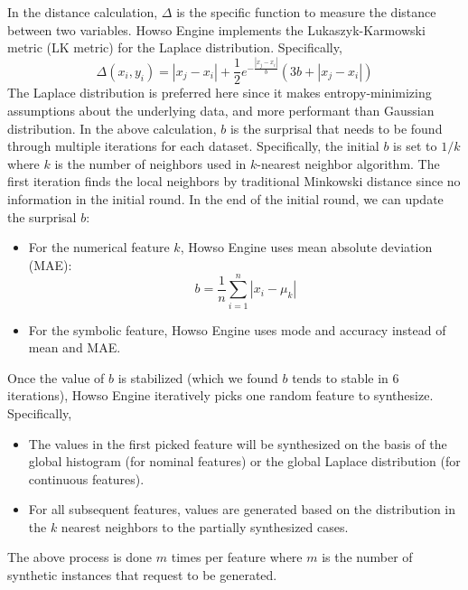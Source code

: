 \documentclass[sigconf,review,anonymous,nonacm=true]{acmart}
\begin{document}
In the distance calculation, $\Delta$ is the specific function to measure the distance between two variables. Howso Engine implements the Lukaszyk-Karmowski metric (LK metric) for the Laplace distribution. Specifically,
\begin{equation}
    \Delta(x_i,y_i) = |x_j - x_i| + \frac{1}{2} e^{-\frac{|x_j - x_i|}{b}} \left( 3b+|x_j - x_i| \right)
\end{equation}
The Laplace distribution is preferred here since it makes entropy-minimizing assumptions about the underlying data, and more performant than Gaussian distribution. In the above calculation, $b$ is the surprisal that needs to be found through multiple iterations for each dataset. Specifically, the initial $b$ is set to $1/k$ where $k$ is the number of neighbors used in $k$-nearest neighbor algorithm. The first iteration finds the local neighbors by traditional Minkowski distance since no information in the initial round. In the end of the initial round, we can update the surprisal $b$:
\begin{itemize}
    \item For the numerical feature $k$, Howso Engine uses mean absolute deviation (MAE):
    \begin{equation}
        b = \frac{1}{n} \sum_{i=1}^{n} |x_i - \mu_k|
    \end{equation}
    \item For the symbolic feature, Howso Engine uses mode and accuracy instead of mean and MAE.
\end{itemize}

Once the value of $b$ is stabilized (which we found $b$ tends to stable in 6 iterations), Howso Engine iteratively picks one random feature to synthesize. Specifically,
\begin{itemize}
    \item The values in the first picked feature will be synthesized on the basis of the global histogram (for nominal features) or the global Laplace distribution (for continuous features).
    \item For all subsequent features, values are generated based on the distribution in the $k$ nearest neighbors to the partially synthesized cases.
\end{itemize}
The above process is done $m$ times per feature where $m$ is the number of synthetic instances that request to be generated.
\end{document}
